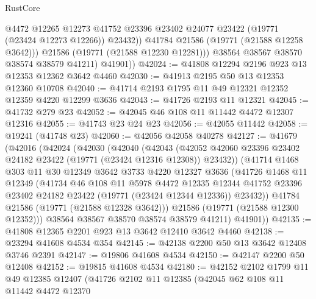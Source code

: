 \begin{lexlean}{RustCore}
\begin{coremodule}
                  @4472
                  @12265
                  @12273
                  @41752
                  @23396
                  @23402
                  @24077
                  @23422
                  (@19771 (@23424 @12273 @12266))
                  @23432))
              @41784
              @21586
              (@19771 (@21588 @12258 @3642)))
            @21586
            (@19771 (@21588 @12230 @12281)))
          @38564
          @38567
          @38570
          @38574
          @38579
          @41211)
        @41901))
@42024 := @41808 @12294 @2196 @923 @13 @12353 @12362 @3642 @4460
@42030 := @41913 @2195 @50 @13 @12353 @12360 @10708
@42040 := @41714 @2193 @1795 @11 @49 @12321 @12352 @12359 @4220 @12299 @3636
@42043 := @41726 @2193 @11 @12321
@42045 := @41732 @279 @23
@42052 := @42045 @46 @108 @11 @11442 @4472 @12307 @12316
@42055 := @41743 @23 @24 @23
@42056 := @42055 @11442
@42058 := @19241 (@41748 @23)
@42060 := @42056 @42058 @40278
@42127 := @41679
    (@42016
      (@42024
        (@42030
          (@42040
            (@42043
              (@42052 @42060 @23396 @23402 @24182 @23422 (@19771 (@23424 @12316 @12308)) @23432))
            (@41714
              @1468
              @303
              @11
              @30
              @12349
              @3642
              @3733
              @4220
              @12327
              @3636
              (@41726
                @1468
                @11
                @12349
                (@41734
                  @46
                  @108
                  @11
                  @5978
                  @4472
                  @12335
                  @12344
                  @41752
                  @23396
                  @23402
                  @24182
                  @23422
                  (@19771 (@23424 @12344 @12336))
                  @23432))
              @41784
              @21586
              (@19771 (@21588 @12328 @3642)))
            @21586
            (@19771 (@21588 @12300 @12352)))
          @38564
          @38567
          @38570
          @38574
          @38579
          @41211)
        @41901))
@42135 := @41808 @12365 @2201 @923 @13 @3642 @12410 @3642 @4460
@42138 := @23294 @41608 @4534 @354
@42145 := @42138 @2200 @50 @13 @3642 @12408 @3746 @2391
@42147 := @19806 @41608 @4534
@42150 := @42147 @2200 @50 @12408
@42152 := @19815 @41608 @4534
@42180 := @42152
    @2102
    @1799
    @11
    @49
    @12385
    @12407
    (@41726
      @2102
      @11
      @12385
      (@42045
        @62
        @108
        @11
        @11442
        @4472
        @12370

\end{coremodule}
\end{lexlean}
